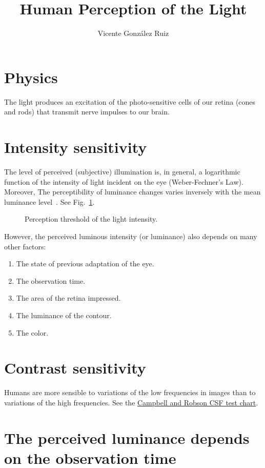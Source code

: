 \title{Human Perception of the Light}
\author{Vicente González Ruiz}
\maketitle

\section{Physics}
The light produces an excitation of the photo-sensitive cells of our
retina (cones and rods) that transmit nerve impulses to our brain.

\section{Intensity sensitivity~\cite{gonzalez1992digital}}
The level of perceived (subjective) illumination is, in general, a
logarithmic function of the intensity of light incident on the eye
(Weber-Fechner's Law). Moreover, The perceptibility of luminance
changes varies inversely with the mean luminance
level~\cite{taubman2012jpeg2000}. See
  Fig.~\ref{fig:light_perception_threshold}.

\begin{figure}
  \caption{Perception threshold of the light intensity.} %
  \label{fig:light_perception_threshold}
\end{figure}

However, the perceived luminous intensity (or luminance) also depends on many other factors:
\begin{enumerate}
\tightlist
\item The state of previous adaptation of the eye.
\item The observation time.
\item The area of the retina impressed.
\item The luminance of the contour.
\item The color.
\end{enumerate}

\section{Contrast sensitivity}
Humans are more sensible to variations of the low frequencies in
images than to variations of the high frequencies. See the
\href{CSF.html}{Campbell and Robson CSF test chart}.
  
\section{The perceived luminance depends on the observation time}


